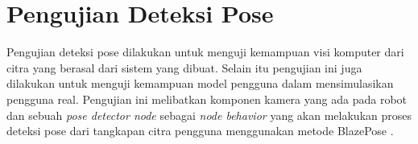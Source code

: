 \section{Pengujian Deteksi Pose}
\label{sec:pengujiandeteksipose}

Pengujian deteksi pose dilakukan untuk menguji kemampuan visi komputer dari citra yang berasal dari sistem yang dibuat.
Selain itu pengujian ini juga dilakukan untuk menguji kemampuan model pengguna dalam mensimulasikan pengguna real.
Pengujian ini melibatkan komponen kamera yang ada pada robot dan sebuah \emph{pose detector node} sebagai \emph{node behavior} yang akan melakukan proses deteksi pose dari tangkapan citra pengguna menggunakan metode BlazePose \citep{cit:bazarevsky2020}.

